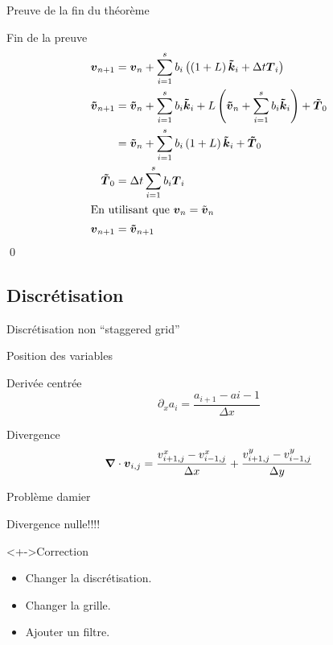 \begin{frame}{Preuve de la fin du théorème}

\begin{block}{Fin de la preuve}
 \begin{align*}
{\boldsymbol {v}}_{n+1}&={\boldsymbol {v}}_{n}+\sum_{i=1}^{s}b_{i}\left(\left(1+L\right){\boldsymbol {\tilde{k}}}_i+\Delta t {\boldsymbol {T}}_{i}\right)\\
{\boldsymbol {\tilde{v}}}_{n+1}&={\boldsymbol {\tilde{v}}}_{n}+\sum_{i=1}^{s}b_{i}{\boldsymbol {\tilde{k}}}_{i}+L\left({\boldsymbol {\tilde{v}}}_{n}+\sum_{i=1}^{s}b_{i}{\boldsymbol {\tilde{k}}}_{i}\right)+{\boldsymbol {\tilde{T}}}_0\\
&={\boldsymbol {\tilde{v}}}_{n}+\sum_{i=1}^{s}b_{i}\left(1+L\right){\boldsymbol {\tilde{k}}}_{i}+{\boldsymbol {\tilde{T}}}_0\\
{\boldsymbol {\tilde{T}}}_0&=\Delta t\sum_{i=1}^{s}b_{i}{\boldsymbol {T}}_{i}\\
\intertext{En utilisant que ${\boldsymbol {v}}_{n}=\tilde{{\boldsymbol {v}}}_{n}$}
{\boldsymbol {v}}_{n+1}&={\boldsymbol {\tilde{v}}}_{n+1}
\end{align*}
\qed
\end{block}

\end{frame}
\subsection{Discrétisation}
\begin{frame}{Discrétisation non  ``staggered grid''}
\begin{block}{Position des variables}
\shorthandoff{;:} 
\shorthandon{:;}
\end{block}
\begin{block}{Derivée centrée}
 \begin{equation*}
  \partial_x a_i=\frac{a_{i+1}-a{i-1}}{\Delta x}
\end{equation*}
\end{block}

\begin{block}{Divergence}
\begin{equation*}
  {\boldsymbol {\nabla}} \cdot {\boldsymbol {v}}_{i,j}=\frac{v^{x}_{i+1,j}-v^{x}_{i-1,j}}{\Delta x}+\frac{v^{y}_{i+1,j}-v^{y}_{i-1,j}}{\Delta y}
\end{equation*}
\end{block}
\end{frame}

\begin{frame}{Problème damier}
\begin{block}{\alert{Divergence nulle!!!!}}
\end{block}

\begin{block}<+->{Correction}
 \begin{itemize}[<+->]
  \item Changer la discrétisation.
  \item Changer la grille.
  \item Ajouter un filtre.
 \end{itemize}

\end{block}

 
\end{frame}

